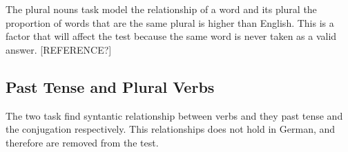 The plural nouns task model the relationship of a word and its plural the
proportion of words that are the same plural is higher than English. This is
a factor that will affect the test because the same word is never taken as a
valid answer. [REFERENCE?] 


\subsection{Past Tense and Plural Verbs}
\label{sec:sub_sec_plural_verbs}
The two task find syntantic relationship between verbs and they past tense
and the conjugation respectively. This relationships does not hold in German,
and therefore are removed from the test.







